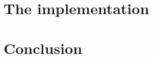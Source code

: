 \documentclass{article}
\begin{document}
\section{The implementation}

\section{Conclusion}


\nocite{*} 
\printbibliography
\end{document}
